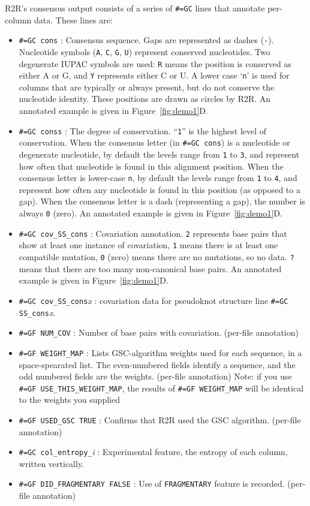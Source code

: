 \documentclass[letterpaper,12pt]{report}
\begin{document}
R2R's consensus output consists of a series of {\tt \#=GC} lines that annotate per-column data.
These lines are:
\begin{itemize}
\item {\tt \#=GC cons} : Consensus sequence.  Gaps are represented as dashes ({\tt -}).  Nucleotide symbols
({\tt A}, {\tt C}, {\tt G}, {\tt U}) represent conserved nucleotides.
Two degenerate IUPAC symbols are used: {\tt R} means the position is conserved as either A or G, 
and {\tt Y} represents either C or U.
A lower case `{\tt n}' is used for columns that are typically or always present, but do not conserve the nucleotide
identity.  These positions are drawn as circles by R2R.
An annotated example is given in Figure~\ref{fig:demo1}D.
\item {\tt \#=GC conss} : The degree of conservation.  ``{\tt 1}'' is the highest level of conservation.
When the consensus letter (in {\tt \#=GC cons}) is a nucleotide
or degenerate nucleotide, by default the levels range from {\tt 1} to {\tt 3}, and represent how often that nucleotide
is found in this alignment position.
When the consensus letter is lower-case {\tt n}, by default the levels range from 
{\tt 1} to {\tt 4}, and represent how often any nucleotide is found in this position (as opposed to a gap).
When the consensus letter is a dash (representing a gap), the number is always {\tt 0} (zero).
An annotated example is given in Figure~\ref{fig:demo1}D.
\item {\tt \#=GC cov\_SS\_cons} : Covariation annotation.
{\tt 2} represents base pairs that show at least one instance of covariation,
{\tt 1} means there is at least one compatible mutation,
{\tt 0} (zero) means there are no mutations, so no data.
{\tt ?} means that there are too many non-canonical base pairs.
An annotated example is given in Figure~\ref{fig:demo1}D.
\item {\tt \#=GC cov\_SS\_cons}{\it x} : covariation data for pseudoknot structure line {\tt \#=GC SS\_cons}{\it x}.
\item {\tt \#=GF NUM\_COV} : Number of base pairs with covariation. (per-file annotation)
\item {\tt \#=GF WEIGHT\_MAP} : Lists GSC-algorithm weights used for each sequence, in a space-spearated list.  The even-numbered fields identify a sequence, and the odd numbered fields are the weights. (per-file annotation)  Note: if you use {\tt \#=GF USE\_THIS\_WEIGHT\_MAP}, the results of {\tt \#=GF WEIGHT\_MAP} will be identical to the weights you supplied
\item {\tt \#=GF USED\_GSC TRUE} : Confirms that R2R used the GSC algorithm.
(per-file annotation) 
\item {\tt \#=GC col\_entropy\_}{\it i} : Experimental feature, the entropy of each column, written vertically.
\item {\tt \#=GF DID\_FRAGMENTARY FALSE} : Use of {\tt FRAGMENTARY} feature is recorded.
(per-file annotation)
\end{itemize}
\end{document}
